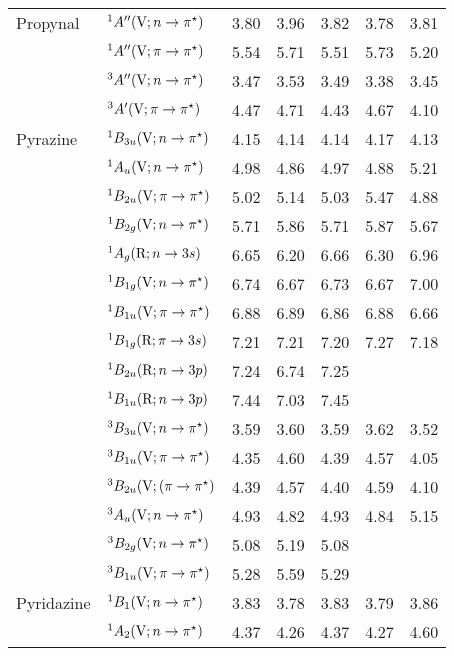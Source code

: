 \begin{tabular}{p{3.5cm}p{3.3cm}c|cccc}
  Propynal		& $^1A^{\prime\prime} (\mathrm{V}; n \rightarrow \pi^\star)$					& 3.80 	&3.96	&3.82	&3.78	&3.81\\ 	
        &$^1A^{\prime\prime} (\mathrm{V}; \pi \rightarrow \pi^\star)$					& 5.54	&5.71	&5.51	&5.73	&5.20\\ 	
        &$^3A^{\prime\prime} (\mathrm{V}; n \rightarrow \pi^\star)$					& 3.47	&3.53	&3.49	&3.38	&3.45\\ 	
        &$^3A^\prime (\mathrm{V}; \pi \rightarrow \pi^\star)$					& 4.47	&4.71	&4.43	&4.67	&4.10\\ 	
  Pyrazine		&$^1B_{3u}  (\mathrm{V}; n \rightarrow \pi^\star)$				& 4.15	&4.14	&4.14	&4.17	&4.13\\ 	
        &$^1A_u    (\mathrm{V}; n \rightarrow \pi^\star)$				& 4.98	&4.86	&4.97	&4.88	&5.21\\ 	
        &$^1B_{2u}  (\mathrm{V}; \pi \rightarrow \pi^\star)$				& 5.02	&5.14	&5.03	&5.47	&4.88\\ 	
        &$^1B_{2g}  (\mathrm{V}; n \rightarrow \pi^\star)$				& 5.71	&5.86	&5.71	&5.87	&5.67\\ 	
        &$^1A_g    (\mathrm{R}; n \rightarrow 3s)$				& 6.65	&6.20	&6.66	&6.30	&6.96\\ 	
        &$^1B_{1g}  (\mathrm{V}; n \rightarrow \pi^\star)$				& 6.74	&6.67	&6.73	&6.67	&7.00\\ 	
        &$^1B_{1u}  (\mathrm{V}; \pi \rightarrow \pi^\star)$				& 6.88	&6.89	&6.86	&6.88	&6.66\\ 	
        &$^1B_{1g}  (\mathrm{R}; \pi \rightarrow 3s)$				& 7.21	&7.21	&7.20	&7.27	&7.18\\ 	
        &$^1B_{2u}  (\mathrm{R}; n \rightarrow 3p)$				& 7.24	&6.74	&7.25	&	 	&\\
        &$^1B_{1u}  (\mathrm{R}; n \rightarrow 3p)$				& 7.44	&7.03	&7.45	&	 	&\\
        &$^3B_{3u}  (\mathrm{V}; n \rightarrow \pi^\star)$				& 3.59 	&3.60	&3.59	&3.62	&3.52\\ 	
        &$^3B_{1u}  (\mathrm{V}; \pi \rightarrow \pi^\star)$				& 4.35	&4.60	&4.39	&4.57	&4.05\\ 	
        &$^3B_{2u}  (\mathrm{V}; (\pi \rightarrow \pi^\star)$				& 4.39	&4.57	&4.40	&4.59	&4.10 \\	
        &$^3A_u    (\mathrm{V}; n \rightarrow \pi^\star)$				& 4.93	&4.82	&4.93	&4.84	&5.15 \\	
        &$^3B_{2g}  (\mathrm{V}; n \rightarrow \pi^\star)$				& 5.08	&5.19	&5.08	&	 	&\\
        &$^3B_{1u}  (\mathrm{V}; \pi \rightarrow \pi^\star)$				& 5.28	&5.59	&5.29	&	 	&\\
  Pyridazine		&$^1B_1 (\mathrm{V}; n \rightarrow \pi^\star)$					& 3.83	&3.78	&3.83	&3.79	&3.86 \\	
        &$^1A_2 (\mathrm{V}; n \rightarrow \pi^\star)$					& 4.37   	&4.26	&4.37	&4.27	&4.60 \\	

\end{tabular}
